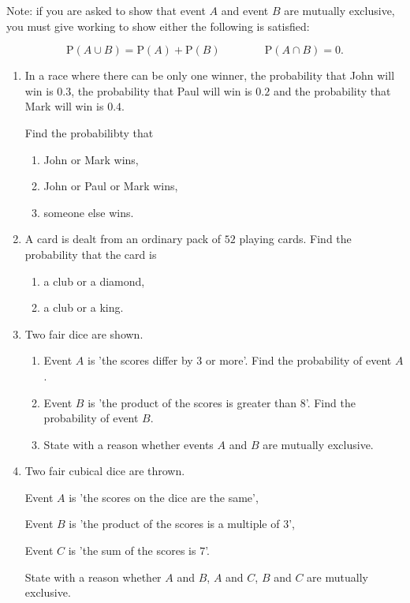 \medskip

Note: if you are asked to show that event $A$ and event $B$ are mutually exclusive, you must give working  to show either the following is satisfied:

\[
\text{P}(A\cup B) = \text{P}(A) +  \text{P}(B) \qquad  \qquad \text{P}(A \cap B) =0.
\]

\exercise  %


\begin{enumerate}
	\item  In a race where there can be only one winner, the probability that John will win is $0.3$,  the probability that Paul will win is $0.2$ and the probability that Mark will win is $0.4$.
	
	Find the probabilibty that 
	
	\begin{enumerate}
		\item John or Mark wins,
		\item John or Paul or Mark wins,
		\item someone else wins.
	\end{enumerate}

\item  A card is dealt from an ordinary pack of $52$ playing cards. Find the probability that the card is 
\begin{enumerate}
	\item a club or a diamond,
	\item a club or a king.
\end{enumerate}

\item Two fair dice are shown.
\begin{enumerate}
	\item Event $A$ is 'the scores differ by $3$ or more'. Find the probability of event $A$.
	\item Event $B$ is 'the product of the scores is greater than $8$'. Find the probability of event $B$.
	\item State with a reason whether events $A$ and $B$ are mutually exclusive.
\end{enumerate}
	
	
	
	
	\item Two fair cubical dice are thrown.
	
	Event $A$ is 'the scores on the dice are the same',
	
	Event $B$ is 'the product of the scores is a multiple of $3$',
	
	Event $C$ is 'the sum of the scores is $7$'.
	
	State with a reason whether $A$ and $B$, $A$ and $C$, $B$ and $C$ are mutually exclusive.
	
	
	
	
\end{enumerate}


